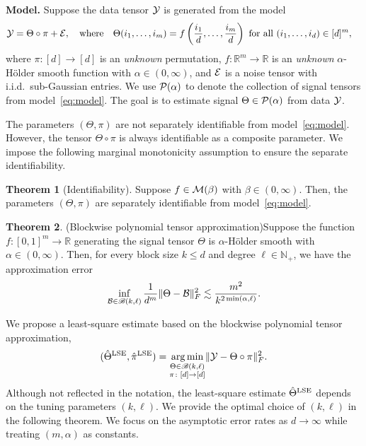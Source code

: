 \documentclass[11pt]{article}
\theoremstyle{definition}
\newtheorem{thm}{Theorem}
\def\caliB{\mathscr{B}}
\begin{document}
{\bf Model.} Suppose the data tensor $\mathcal{Y}$ is generated from the model
\begin{align}\label{eq:model}
\mathcal{Y}=\Theta\circ \pi+\mathcal{E},\quad \text{where}\quad \Theta(i_1,\ldots,i_m)&=f\left({i_1\over d}, \ldots,{i_m\over d}\right)\ \text{for all }(i_1,\ldots,i_d)\in[d]^m,
\end{align}
where $\pi\colon[d]\to[d]$ is an \emph{unknown} permutation, $f\colon \mathbb{R}^m\to\mathbb{R}$ is an \emph{unknown} $\alpha$-H\"older smooth function with $\alpha\in(0,\infty)$, and $\mathcal{E}$ is a noise tensor with i.i.d.\ sub-Gaussian entries. We use $\mathcal{P}(\alpha)$ to denote the collection of signal tensors from model~\eqref{eq:model}. The goal is to estimate signal $\Theta\in\mathcal{P}(\alpha)$ from data $\mathcal{Y}$. 


The parameters $(\Theta, \pi)$ are not separately identifiable from model~\eqref{eq:model}. However, the tensor $\Theta\circ \pi$ is always identifiable as a composite parameter. We impose the following marginal monotonicity assumption to ensure the separate identifiability. 
\begin{thm}[Identifiability] Suppose $f\in \mathcal{M}(\beta)$ with $\beta\in(0,\infty)$. Then, the parameters $(\Theta,\pi)$ are separately identifiable from model~\eqref{eq:model}. 
\end{thm}

\begin{thm}(Blockwise polynomial tensor approximation)\label{thm:approx} Suppose the function $f\colon[0,1]^m\to \mathbb{R}$ generating the signal tensor $\Theta$ is $\alpha$-H\"older smooth with $\alpha\in(0,\infty)$. Then, for every block size $k\leq d$ and degree $\ell\in\mathbb{N}_{+}$, we have the approximation error
\[
\inf_{\tB\in \caliB(k,\ell)}{1\over d^m}\FnormSize{}{\Theta-\tB}^2 \lesssim {m^2\over k^{2\min(\alpha, \ell)}}.
\]
\end{thm}

We propose a least-square estimate based on the blockwise polynomial tensor approximation,
\[
(\hat \Theta^\textup{LSE},\hat \pi^\textup{LSE})=\argmin_{\substack{\Theta\in \caliB(k,\ell)\\ \pi\colon[d]\to[d]}}\FnormSize{}{\tY-\Theta\circ \pi}^2.
\]
Although not reflected in the notation, the least-square estimate $\hat \Theta^\textup{LSE}$ depends on the tuning parameters $(k,\ell)$. We provide the optimal choice of $(k,\ell)$ in the following theorem.  We focus on the asymptotic error rates as $d\to\infty$ while treating $(m,\alpha)$ as constants. 
\end{document}
